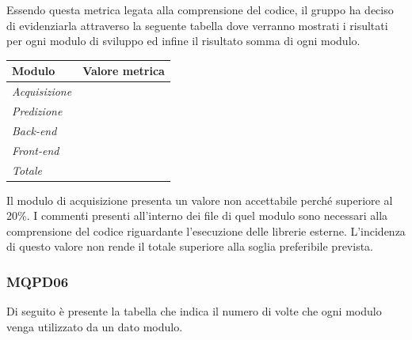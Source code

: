 {{{{{{Essendo questa metrica legata alla comprensione del codice, il gruppo ha deciso di evidenziarla attraverso la seguente tabella dove verranno mostrati i risultati per ogni modulo di sviluppo ed infine il risultato somma di ogni modulo.

\quad
\def\tabularxcolumn#1{m{#1}}
{
	\begin{center}
	\renewcommand{\arraystretch}{1.4}
	\begin{longtable}[c]{|p{3cm}|p{3cm}|}
			\hline
			\rowcolor{airforceblue}
			\textbf{Modulo} & \textbf{Valore metrica}\\
			\hline
			\textit{Acquisizione} & \makecell[c]{27\%} \\
			\hline
			\textit{Predizione} & \makecell[c]{18\%}\\
			\hline
			\textit{Back-end} &  \makecell[c]{11\%}\\
			\hline
			\textit{Front-end} & \makecell[c]{0,2\%} \\
			\hline
			\textit{Totale} & \makecell[c]{8\%}\\
			\hline
		\end{longtable}
	\end{center}

Il modulo di acquisizione presenta un valore non accettabile perché superiore al 20\%. I commenti presenti all'interno dei file di quel modulo sono necessari alla comprensione del codice riguardante l'esecuzione delle librerie esterne. L'incidenza di questo valore non rende il totale superiore alla soglia preferibile prevista.

\subsubsection{MQPD06}\label{ResocontoAttivitàDiVerificaRevisioneDiQualificaVerificheDiProcessoMQPD06}

Di seguito è presente la tabella che indica il numero di volte che ogni modulo venga utilizzato da un dato modulo.

}}}}}}}

